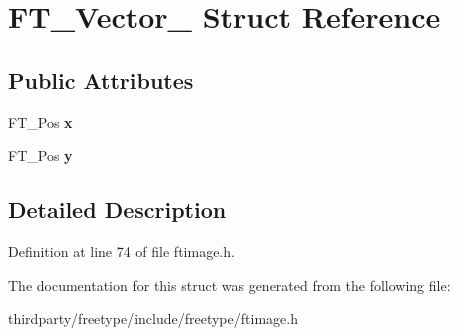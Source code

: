\hypertarget{struct_f_t___vector__}{}\section{F\+T\+\_\+\+Vector\+\_\+ Struct Reference}
\label{struct_f_t___vector__}
\subsection*{Public Attributes}
\begin{DoxyCompactItemize}
\item 
\mbox{\label{struct_f_t___vector___a941e818e6dfca06409cddff4f325f74c}} 
F\+T\+\_\+\+Pos {\bfseries x}
\item 
\mbox{\label{struct_f_t___vector___ac3246ed214e880047ec74eeb15f8b973}} 
F\+T\+\_\+\+Pos {\bfseries y}
\end{DoxyCompactItemize}


\subsection{Detailed Description}


Definition at line 74 of file ftimage.\+h.



The documentation for this struct was generated from the following file\+:\begin{DoxyCompactItemize}
\item 
thirdparty/freetype/include/freetype/ftimage.\+h\end{DoxyCompactItemize}

